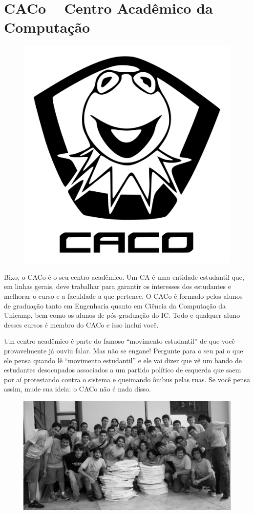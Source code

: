 
\section{CACo -- Centro Acadêmico da Computação}

\begin{figure}[H]
    \centering
    \includegraphics[width=.45\textwidth]{img/caco_logo.pdf}
\end{figure}

Bixo, o CACo é o seu centro acadêmico. Um CA é uma entidade estudantil que, em
linhas gerais, deve trabalhar para garantir os interesses dos estudantes e
melhorar o curso e a faculdade a que pertence. O CACo é formado pelos alunos de
graduação tanto em Engenharia quanto em Ciência da Computação da Unicamp, bem
como os alunos de pós-graduação do IC. Todo e qualquer aluno desses cursos é
membro do CACo e isso inclui você.

Um centro acadêmico é parte do famoso ``movimento estudantil'' de que você
provavelmente já ouviu falar. Mas não se engane! Pergunte para o seu pai o que
ele pensa quando lê ``movimento estudantil'' e ele vai dizer que vê um bando de
estudantes desocupados associados a um partido político de esquerda que saem por
aí protestando contra o sistema e queimando ônibus pelas ruas. Se você pensa
assim, mude sua ideia: o CACo não é nada disso.

\begin{figure}[H]
    \centering
    \includegraphics[scale=0.22]{img/alem_da_graduacao/caco_pizzada1.jpg}
\end{figure}

